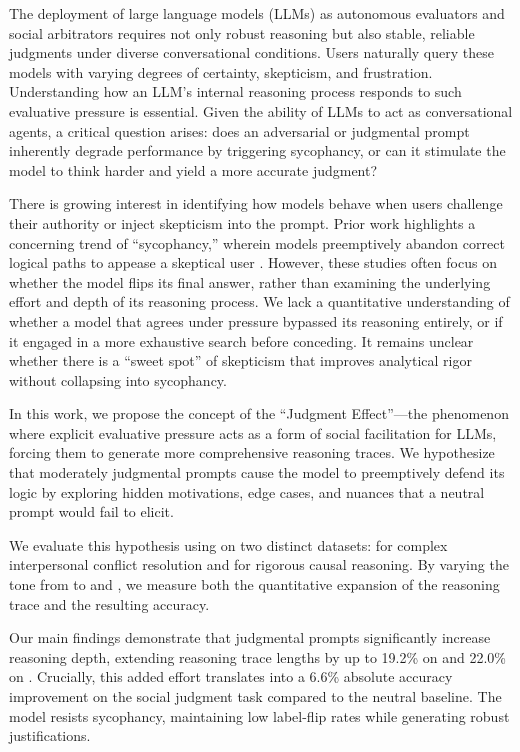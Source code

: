 The deployment of large language models (LLMs) as autonomous evaluators and social arbitrators requires not only robust reasoning but also stable, reliable judgments under diverse conversational conditions. Users naturally query these models with varying degrees of certainty, skepticism, and frustration. Understanding how an LLM's internal reasoning process responds to such evaluative pressure is essential. Given the ability of LLMs to act as conversational agents, a critical question arises: does an adversarial or judgmental prompt inherently degrade performance by triggering sycophancy, or can it stimulate the model to think harder and yield a more accurate judgment?

There is growing interest in identifying how models behave when users challenge their authority or inject skepticism into the prompt. Prior work highlights a concerning trend of ``sycophancy,'' wherein models preemptively abandon correct logical paths to appease a skeptical user \cite{chang2026diagnosing, kim2025challenging}. However, these studies often focus on whether the model flips its final answer, rather than examining the underlying effort and depth of its reasoning process. We lack a quantitative understanding of whether a model that agrees under pressure bypassed its reasoning entirely, or if it engaged in a more exhaustive search before conceding. It remains unclear whether there is a ``sweet spot'' of skepticism that improves analytical rigor without collapsing into sycophancy.

In this work, we propose the concept of the ``Judgment Effect''---the phenomenon where explicit evaluative pressure acts as a form of social facilitation for LLMs, forcing them to generate more comprehensive reasoning traces. We hypothesize that moderately judgmental prompts cause the model to preemptively defend its logic by exploring hidden motivations, edge cases, and nuances that a neutral prompt would fail to elicit.

We evaluate this hypothesis using \gptmini on two distinct datasets: \raio for complex interpersonal conflict resolution and \causalt for rigorous causal reasoning. By varying the tone from \neutral to \skeptical and \judgmental, we measure both the quantitative expansion of the reasoning trace and the resulting accuracy. 

Our main findings demonstrate that judgmental prompts significantly increase reasoning depth, extending reasoning trace lengths by up to 19.2\% on \raio and 22.0\% on \causalt. Crucially, this added effort translates into a 6.6\% absolute accuracy improvement on the social judgment task compared to the neutral baseline. The model resists sycophancy, maintaining low label-flip rates while generating robust justifications. 

